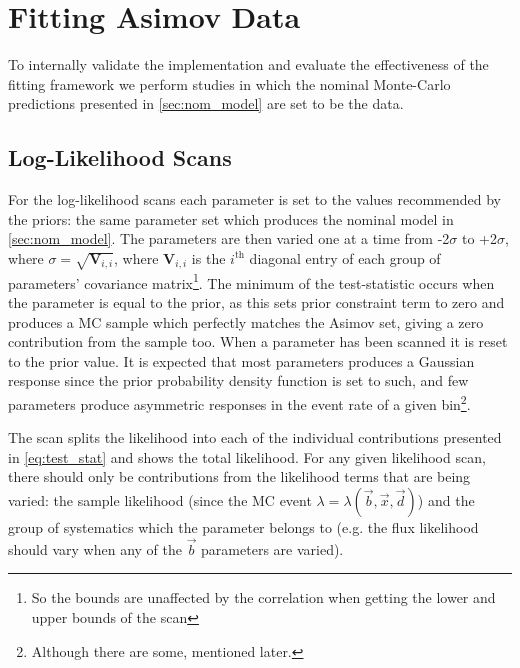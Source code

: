 \section{Fitting Asimov Data}
\label{sec:asimov}
To internally validate the implementation and evaluate the effectiveness of the fitting framework we perform studies in which the nominal Monte-Carlo predictions presented in \autoref{sec:nom_model} are set to be the data.

\subsection{Log-Likelihood Scans}
\label{sec:llh_scan}
For the log-likelihood scans each parameter is set to the values recommended by the priors: the same parameter set which produces the nominal model in \autoref{sec:nom_model}. The parameters are then varied one at a time from -2$\sigma$ to +2$\sigma$, where $\sigma = \sqrt{\mathbf{V}_{i,i}}$, where $\mathbf{V}_{i,i}$ is the $i^{\text{th}}$ diagonal entry of each group of parameters' covariance matrix\footnote{So the bounds are unaffected by the correlation when getting the lower and upper bounds of the scan}. The minimum of the test-statistic occurs when the parameter is equal to the prior, as this sets prior constraint term to zero and produces a MC sample which perfectly matches the Asimov set, giving a zero contribution from the sample too. When a parameter has been scanned it is reset to the prior value. It is expected that most parameters produces a Gaussian response since the prior probability density function is set to such, and few parameters produce asymmetric responses in the event rate of a given bin\footnote{Although there are some, mentioned later.}.

The scan splits the likelihood into each of the individual contributions presented in \autoref{eq:test_stat} and shows the total likelihood. For any given likelihood scan, there should only be contributions from the likelihood terms that are being varied: the sample likelihood (since the MC event $\lambda=\lambda(\vec{b},\vec{x},\vec{d})$) and the group of systematics which the parameter belongs to (e.g. the flux likelihood should vary when any of the $\vec{b}$ parameters are varied).

